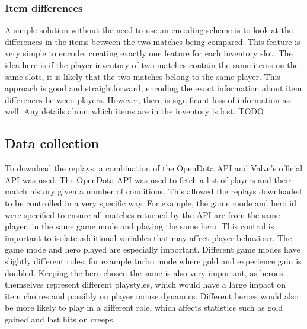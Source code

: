 \documentclass[Report.tex]{subfiles}
\begin{document}
\subsubsection{Item differences}
A simple solution without the need to use an encoding scheme is to look at the differences in the items between the two matches being compared. This feature is very simple to encode, creating exactly one feature for each inventory slot. The idea here is if the player inventory of two matches contain the same items on the same slots, it is likely that the two matches belong to the same player. This approach is good and straightforward, encoding the exact information about item differences between players. However, there is significant loss of information as well. Any details about which items are in the inventory is lost. TODO
 

\subsection{Data collection}\label{sec:data-collection}
To download the replays, a combination of the OpenDota \cite{opendota} API and Valve's official API was used. The OpenDota API was used to fetch a list of players and their match history given a number of conditions. This allowed the replays downloaded to be controlled in a very specific way. For example, the game mode and hero id were specified to ensure all matches returned by the API are from the same player, in the same game mode and playing the same hero. This control is important to isolate additional variables that may affect player behaviour. The game mode and hero played are especially important. Different game modes have slightly different rules, for example turbo mode where gold and experience gain is doubled. Keeping the hero chosen the same is also very important, as heroes themselves represent different playstyles, which would have a large impact on item choices and possibly on player mouse dynamics. Different heroes would also be more likely to play in a different role, which affects statistics such as gold gained and last hits on creeps. 
\end{document}
